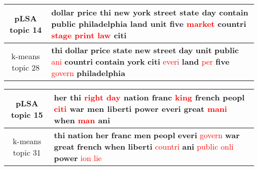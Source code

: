 \begin{center}\begin{tabularx}{\textwidth} {
  | c | >{\raggedright\arraybackslash}X | } \hline 
pLSA topic 14 & \textbf{dollar} \textbf{price} \textbf{thi} \textbf{new} \textbf{york} \textbf{street} \textbf{state} \textbf{day} \textbf{contain} \textbf{public} \textbf{philadelphia} \textbf{land} \textbf{unit} \textbf{five} \textcolor{red}{market} \textbf{countri} \textcolor{red}{stage} \textcolor{red}{print} \textcolor{red}{law} \textbf{citi} \\ \hline 
k-means topic 28 & \textbf{thi} \textbf{dollar} \textbf{price} \textbf{state} \textbf{new} \textbf{street} \textbf{day} \textbf{unit} \textbf{public} \textcolor{red}{ani} \textbf{countri} \textbf{contain} \textbf{york} \textbf{citi} \textcolor{red}{everi} \textbf{land} \textcolor{red}{per} \textbf{five} \textcolor{red}{govern} \textbf{philadelphia} \\ \hline 
\end{tabularx}

\end{center}

\begin{center}\begin{tabularx}{\textwidth} {
  | c | >{\raggedright\arraybackslash}X | } \hline 
pLSA topic 15 & \textbf{her} \textbf{thi} \textcolor{red}{right} \textcolor{red}{day} \textbf{nation} \textbf{franc} \textcolor{red}{king} \textbf{french} \textbf{peopl} \textcolor{red}{citi} \textbf{war} \textbf{men} \textbf{liberti} \textbf{power} \textbf{everi} \textbf{great} \textcolor{red}{mani} \textbf{when} \textcolor{red}{man} \textbf{ani} \\ \hline 
k-means topic 31 & \textbf{thi} \textbf{nation} \textbf{her} \textbf{franc} \textbf{men} \textbf{peopl} \textbf{everi} \textcolor{red}{govern} \textbf{war} \textbf{great} \textbf{french} \textbf{when} \textbf{liberti} \textcolor{red}{countri} \textbf{ani} \textcolor{red}{public} \textcolor{red}{onli} \textbf{power} \textcolor{red}{ion} \textcolor{red}{lie} \\ \hline 
\end{tabularx}

\end{center}


